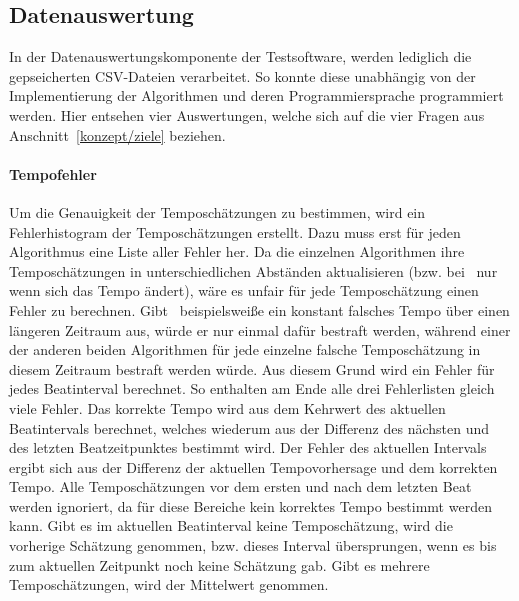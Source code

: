 {	\subsection{Datenauswertung}
	{
		In der Datenauswertungskomponente der Testsoftware,
			werden lediglich die gepseicherten CSV-Dateien verarbeitet.
		So konnte diese unabhängig von der Implementierung der Algorithmen und deren Programmiersprache programmiert werden.
		Hier entsehen vier Auswertungen,
			welche sich auf die vier Fragen aus Anschnitt~\ref{konzept/ziele} beziehen.

		\paragraph{Tempofehler}
		{
			Um die Genauigkeit der Temposchätzungen zu bestimmen,
				wird ein Fehlerhistogram der Temposchätzungen erstellt.
			Dazu muss erst für jeden Algorithmus eine Liste aller Fehler her.
			Da die einzelnen Algorithmen ihre Temposchätzungen in unterschiedlichen Abständen aktualisieren
				(bzw. bei~\cite{2011_PlRoSt} nur wenn sich das Tempo ändert),
				wäre es unfair für jede Temposchätzung einen Fehler zu berechnen.
			Gibt~\cite{2011_PlRoSt} beispielswei{\ss}e ein konstant falsches Tempo über einen längeren Zeitraum aus,
				würde er nur einmal dafür bestraft werden,
				während einer der anderen beiden Algorithmen für jede einzelne falsche Temposchätzung in diesem Zeitraum bestraft werden würde.
			Aus diesem Grund wird ein Fehler für jedes Beatinterval berechnet.
			So enthalten am Ende alle drei Fehlerlisten gleich viele Fehler.
			Das korrekte Tempo wird aus dem Kehrwert des aktuellen Beatintervals berechnet,
				welches wiederum aus der Differenz des nächsten und des letzten Beatzeitpunktes bestimmt wird.
			Der Fehler des aktuellen Intervals ergibt sich aus der Differenz der aktuellen Tempovorhersage und dem korrekten Tempo.
			Alle Temposchätzungen vor dem ersten und nach dem letzten Beat werden ignoriert,
				da für diese Bereiche kein korrektes Tempo bestimmt werden kann.
			Gibt es im aktuellen Beatinterval keine Temposchätzung,
				wird die vorherige Schätzung genommen,
				bzw. dieses Interval übersprungen,
				wenn es bis zum aktuellen Zeitpunkt noch keine Schätzung gab.
			Gibt es mehrere Temposchätzungen,
				wird der Mittelwert genommen.

}}}
